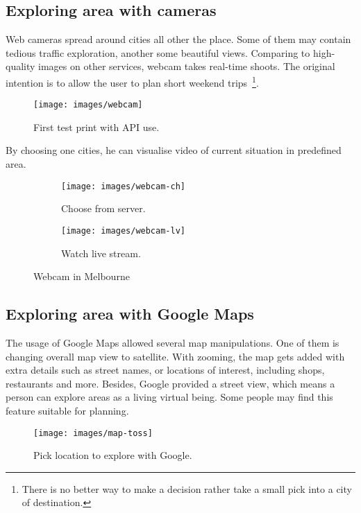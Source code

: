 \documentclass[12pt]{article}
\numberwithin{equation}{section} %
\numberwithin{figure}{section} %
\numberwithin{table}{section} %
\begin{document}
	\subsection{Exploring area with cameras}
		Web cameras spread around cities all other the place. Some of them may contain tedious traffic exploration, another some beautiful views. Comparing to high-quality images on other services, webcam takes real-time shoots. The original intention is to allow the user to plan short weekend trips~\footnote{There is no better way to make a decision rather take a small pick into a city of destination.}.
		\begin{figure}[H]
			\centering        
			\texttt{[image: images/webcam]}
			\caption{First test print with API use.}
			\label{fig:webcam}
		\end{figure}
		By choosing one cities, he can visualise video of current situation in predefined area.
		\begin{figure}[H]
			\begin{subfigure}[b]{0.52\textwidth}
				\centering
				\texttt{[image: images/webcam-ch]}
				\caption{Choose from server.}
				
			\end{subfigure}
			\begin{subfigure}[b]{0.52\textwidth}
				\centering
				\texttt{[image: images/webcam-lv]}
				\caption{Watch live stream.}
				
			\end{subfigure}
			\caption{Webcam in Melbourne}
		\end{figure}
	
	\subsection{Exploring area with Google Maps}
		The usage of Google Maps allowed several map manipulations. One of them is changing overall map view to satellite. With zooming, the map gets added with extra details such as street names, or locations of interest, including shops, restaurants and more. Besides, Google provided a street view, which means a person can explore areas as a living virtual being. Some people may find this feature suitable for planning.
		\begin{figure}[H]
			\centering        
			\texttt{[image: images/map-toss]}
			\caption{Pick location to explore with Google.}
			\label{fig:toss}
		\end{figure}
\end{document}
